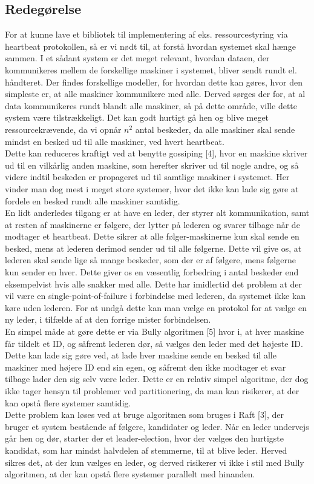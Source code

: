 \documentclass[a4paper,12pt]{article}
\begin{document}
\subsection{Redegørelse}
For at kunne lave et bibliotek til implementering af eks. ressourcestyring via heartbeat protokollen, så er vi nødt til, at forstå hvordan systemet skal hænge sammen.
I et sådant system er det meget relevant, hvordan dataen, der kommunikeres mellem de forskellige maskiner i systemet, bliver sendt rundt el. håndteret.
Der findes forskellige modeller, for hvordan dette kan gøres, hvor den simpleste er, at alle maskiner kommunikere med alle.
Derved sørges der for, at al data kommunikeres rundt blandt alle maskiner, så på dette område, ville dette system være tilstrækkeligt. 
Det kan godt hurtigt gå hen og blive meget ressourcekrævende, da vi opnår $n^2$ antal beskeder, da alle maskiner skal sende mindst en besked ud til alle maskiner, ved hvert heartbeat.
\\
Dette kan reduceres kraftigt ved at benytte gossiping [4], hvor en maskine skriver ud til en vilkårlig anden maskine, som herefter skriver ud til nogle andre, og så videre indtil beskeden er propageret ud til samtlige maskiner i systemet. 
Her vinder man dog mest i meget store systemer, hvor det ikke kan lade sig gøre at fordele en besked rundt alle maskiner samtidig.
\\
En lidt anderledes tilgang er at have en leder, der styrer alt kommunikation, samt at resten af maskinerne er følgere, der lytter på lederen og svarer tilbage når de modtager et heartbeat. Dette sikrer at alle følger-maskinerne kun skal sende en besked, mens at lederen derimod sender ud til alle følgerne. Dette vil give os, at lederen skal sende lige så mange beskeder, som der er af følgere, mens følgerne kun sender en hver. 
Dette giver os en væsentlig forbedring i antal beskeder end eksempelvist hvis alle snakker med alle. Dette har imidlertid det problem at der vil være en single-point-of-failure i forbindelse med lederen, da systemet ikke kan køre uden lederen. For at undgå dette kan man vælge en protokol for at vælge en ny leder, i tilfælde af at den forrige mister forbindelsen. 
\\
En simpel måde at gøre dette er via Bully algoritmen [5] hvor i, at hver maskine får tildelt et ID, og såfremt lederen dør, så vælges den leder med det højeste ID. Dette kan lade sig gøre ved, at lade hver maskine sende en besked til alle maskiner med højere ID end sin egen, og såfremt den ikke modtager et svar tilbage lader den sig selv være leder. Dette er en relativ simpel algoritme, der dog ikke tager hensyn til problemer ved partitionering, da man kan risikerer, at der kan opstå flere systemer samtidig. 
\\
Dette problem kan løses ved at bruge algoritmen som bruges i Raft [3], der bruger et system bestående af følgere, kandidater og leder.
Når en leder undervejs går hen og dør, starter der et leader-election, hvor der vælges den hurtigste kandidat, som har mindst halvdelen af stemmerne, til at blive leder. Herved sikres det, at der kun vælges en leder, og derved risikerer vi ikke i stil med Bully algoritmen, at der kan opstå flere systemer parallelt med hinanden.
\\
  
\end{document}
